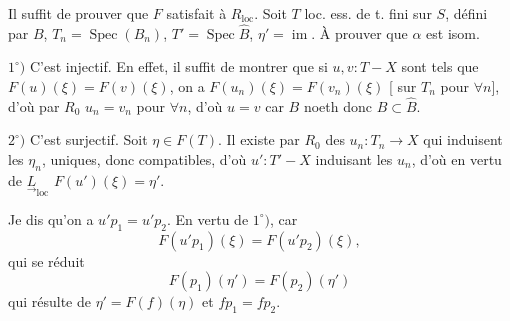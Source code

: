 Il suffit de prouver que $F$ satisfait à $R_{\mathrm{loc}}$.
Soit $T$ loc. ess. de t. fini sur $S$, défini par $B$, $T_n=\operatorname{Spec}(B_n)$, $T'=\operatorname{Spec}\widehat B$, $\eta'=\operatorname{im}$.
À prouver que \textcircled{$\alpha$} est isom.

$1^\circ)$ C'est injectif. En effet, il suffit de montrer que si $u,v:T\mathbin{-}X$ sont tels que $F(u)(\xi)=F(v)(\xi)$, on a $F(u_n)(\xi)=F(v_n)(\xi)$ [ sur $T_n$ pour $\forall n$], d'où par $R_0$ $u_n=v_n$ pour $\forall n$, d'où $u=v$ car $B$ noeth donc $B\subset\widehat B$.

$2^\circ)$ C'est surjectif.  Soit $\eta\in F(T)$.
Il existe par $R_0$ des $u_n:T_n\to X$ qui induisent les $\eta_n$, uniques, donc compatibles, d'où  $u':T'\mathbin{-}X$  induisant les $u_n$, d'où  en vertu de $\underset{\rightarrow}{L}_{\mathrm{loc}}$  $F(u')(\xi)=\eta'$.

Je dis qu'on a  $u'p_1=u'p_2$. En vertu de $1^\circ)$, car  
\[
F(u'p_1)(\xi)=F(u'p_2)(\xi),
\]
qui se réduit
\[
F(p_1)(\eta')=F(p_2)(\eta')
\]
qui résulte de $\eta'=F(f)(\eta)$ et $fp_1=fp_2$.
